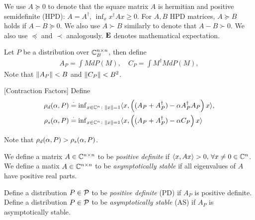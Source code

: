 \documentclass{article}
\begin{document}
We use $A\succeq 0$ to denote that the
square matrix $A$ is hermitian and positive semidefinite (HPD):
$A = A^\dag$, $\inf_x x^\dag A x\ge 0$.
For $A,B$ HPD matrices, $A\succeq B$ holds if $A-B\succeq 0$.
We also use $A\succ B$ similarly to denote that $A-B \succ 0$.
We also use $\preceq$ and $\prec$ analogously. $\E$ denotes mathematical expectation.

\begin{definition}
Let $P$ be a distribution over $\C_B^{\ncn}$, then define
\begin{align*}
A_P=\int M dP(M),\quad C_P=\int M^\dag M dP(M),
\end{align*}
Note that $\norm{A_P}<B$ and $\norm{C_P}<B^2$.
\end{definition}
\begin{definition}\label{contract}[Contraction Factors]
Define
\begin{align*}
\rhod{P}&\eqdef {\inf}_{x\in\C^n\colon\norm{x}=1}\ip{x,\left((A_P+A_P^\dag)-\alpha A_P^\dag A_P\right)x},\\ \rhos{P}&\eqdef{\inf}_{x\in \C^n\colon\norm{x}=1}\ip{x,\left((A_P+A_P^\dag)-\alpha C_P\right)x}
\end{align*}
\end{definition}
Note that $\rhod{P}>\rhos{P}$.

\begin{definition}
We define a matrix $A\in \C^{\ncn}$ to be \emph{positive definite} if $\ip{x,Ax} >0,\,\forall x\neq 0 \in \C^{n}$. We define a matix $A\in \C^{\ncn}$ to be \emph{asymptotically stable} if all eigenvalues of $A$ have positive real parts.
\end{definition}
\begin{definition}\label{distpd}
Define a distribution $P\in \P$ to be \emph{positive definite} (PD)  if $A_P$ is positive definite. Define a distribution $P\in \P$ to be \emph{asymptotically stable} (AS) if $A_P$ is asymptotically stable.
\end{definition}
\end{document}
